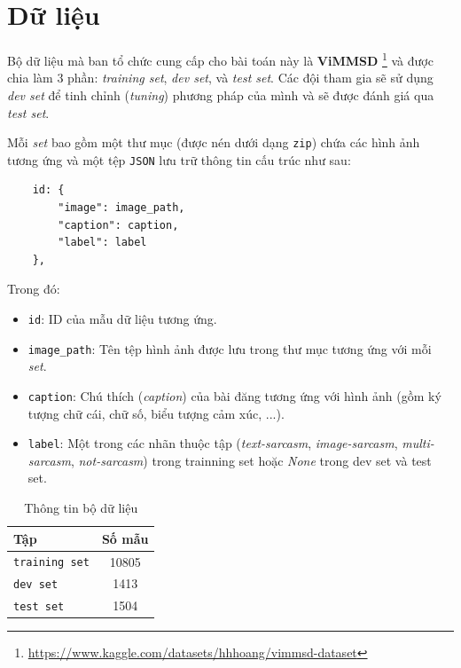 \documentclass[11pt]{article}
\begin{document}
\section{Dữ liệu}
\hspace{2mm} Bộ dữ liệu mà ban tổ chức cung cấp cho bài toán này là \textbf{ViMMSD} \footnote{\url{https://www.kaggle.com/datasets/hhhoang/vimmsd-dataset}} và được chia làm 3 phần: \textit{training set}, \textit{dev set}, và \textit{test set}. Các đội tham gia sẽ sử dụng \textit{dev set} để tinh chỉnh (\textit{tuning}) phương pháp của mình và sẽ được đánh giá qua \textit{test set}.  

\hspace{2mm} Mỗi \textit{set} bao gồm một thư mục (được nén dưới dạng \texttt{zip}) chứa các hình ảnh tương ứng và một tệp \texttt{JSON} lưu trữ thông tin cấu trúc như sau:

\begin{verbatim}
    id: { 
        "image": image_path, 
        "caption": caption, 
        "label": label 
    },
\end{verbatim}

\noindent Trong đó:
\begin{itemize}
\vspace*{-2mm}
    \item \texttt{id}: ID của mẫu dữ liệu tương ứng.
    \vspace*{-2mm}
    \item \texttt{image\_path}: Tên tệp hình ảnh được lưu trong thư mục tương ứng với mỗi \textit{set}.
    \vspace*{-2mm}
    
    \item \texttt{caption}: Chú thích (\textit{caption}) của bài đăng tương ứng với hình ảnh (gồm ký tượng chữ cái, chữ số, biểu tượng cảm xúc, ...).
    \vspace*{-2mm}
    
    \item \texttt{label}: Một trong các nhãn thuộc tập (\textit{text-sarcasm}, \textit{image-sarcasm}, \textit{multi-sarcasm}, \textit{not-sarcasm}) trong trainning set hoặc \textit{None} trong dev set và test set.
\end{itemize}
\vspace*{-3mm}
\begin{table}[h!]
\centering
\small\begin{tabular}{|l|c|}
\hline
\textbf{Tập}  & \textbf{Số mẫu} \\ \hline
\texttt{training set} & 10805           \\ 
\texttt{dev set}      & 1413    \\ 
\texttt{test set}     & 1504   \\ \hline
\end{tabular}
\caption{Thông tin bộ dữ liệu}
\label{table:dataset-info}
\end{table}
\vspace*{-5mm}
    
\end{document}
